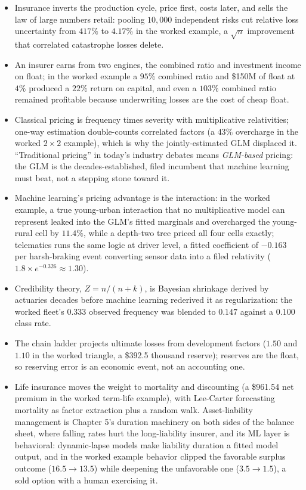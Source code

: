 \documentclass[../ai_in_finance]{subfiles}
\begin{document}
\begin{itemize}
\item Insurance inverts the production cycle, price first, costs later, and sells the law of large numbers retail: pooling $10{,}000$ independent risks cut relative loss uncertainty from $417\%$ to $4.17\%$ in the worked example, a $\sqrt{n}$ improvement that correlated catastrophe losses delete.
\item An insurer earns from two engines, the combined ratio and investment income on float; in the worked example a $95\%$ combined ratio and \$150M of float at $4\%$ produced a $22\%$ return on capital, and even a $103\%$ combined ratio remained profitable because underwriting losses are the cost of cheap float.
\item Classical pricing is frequency times severity with multiplicative relativities; one-way estimation double-counts correlated factors (a $43\%$ overcharge in the worked $2\times2$ example), which is why the jointly-estimated GLM displaced it. ``Traditional pricing'' in today's industry debates means \emph{GLM-based} pricing: the GLM is the decades-established, filed incumbent that machine learning must beat, not a stepping stone toward it.
\item Machine learning's pricing advantage is the interaction: in the worked example, a true young-urban interaction that no multiplicative model can represent leaked into the GLM's fitted marginals and overcharged the young-rural cell by $11.4\%$, while a depth-two tree priced all four cells exactly; telematics runs the same logic at driver level, a fitted coefficient of $-0.163$ per harsh-braking event converting sensor data into a filed relativity ($1.8 \times e^{-0.326} \approx 1.30$).
\item Credibility theory, $Z = n/(n+k)$, is Bayesian shrinkage derived by actuaries decades before machine learning rederived it as regularization: the worked fleet's $0.333$ observed frequency was blended to $0.147$ against a $0.100$ class rate.
\item The chain ladder projects ultimate losses from development factors ($1.50$ and $1.10$ in the worked triangle, a \$392.5 thousand reserve); reserves are the float, so reserving error is an economic event, not an accounting one.
\item Life insurance moves the weight to mortality and discounting (a \$961.54 net premium in the worked term-life example), with Lee-Carter forecasting mortality as factor extraction plus a random walk. Asset-liability management is Chapter 5's duration machinery on both sides of the balance sheet, where falling rates hurt the long-liability insurer, and its ML layer is behavioral: dynamic-lapse models make liability duration a fitted model output, and in the worked example behavior clipped the favorable surplus outcome ($16.5 \to 13.5$) while deepening the unfavorable one ($3.5 \to 1.5$), a sold option with a human exercising it.

\end{itemize}
\end{document}

